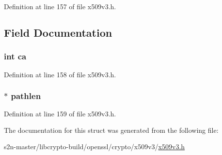 Definition at line 157 of file x509v3.\+h.



\subsection{Field Documentation}
\subsubsection[{\texorpdfstring{ca}{ca}}]{\setlength{\rightskip}{0pt plus 5cm}int ca}\hypertarget{struct_b_a_s_i_c___c_o_n_s_t_r_a_i_n_t_s__st_a2fac671580d5a7a3318d081ac0ac5958}{}\label{struct_b_a_s_i_c___c_o_n_s_t_r_a_i_n_t_s__st_a2fac671580d5a7a3318d081ac0ac5958}


Definition at line 158 of file x509v3.\+h.

\subsubsection[{\texorpdfstring{pathlen}{pathlen}}]{ $\ast$ pathlen}\hypertarget{struct_b_a_s_i_c___c_o_n_s_t_r_a_i_n_t_s__st_a943b2c1be19d99b8291ebd26fca75952}{}\label{struct_b_a_s_i_c___c_o_n_s_t_r_a_i_n_t_s__st_a943b2c1be19d99b8291ebd26fca75952}


Definition at line 159 of file x509v3.\+h.



The documentation for this struct was generated from the following file\+:\begin{DoxyCompactItemize}
\item 
s2n-\/master/libcrypto-\/build/openssl/crypto/x509v3/\hyperlink{crypto_2x509v3_2x509v3_8h}{x509v3.\+h}\end{DoxyCompactItemize}
